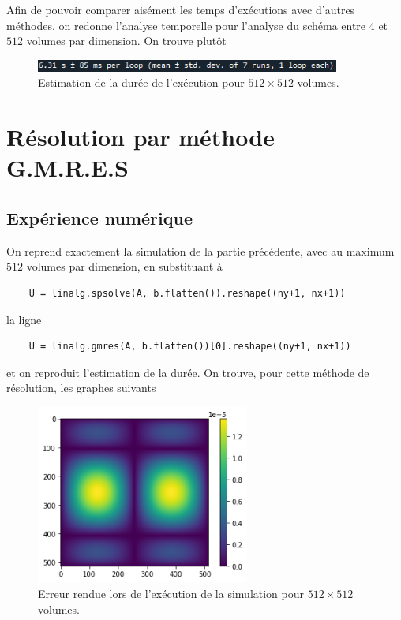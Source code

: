 Afin de pouvoir comparer aisément les temps d'exécutions avec d'autres méthodes, on redonne l'analyse temporelle pour l'analyse du schéma entre $4$ et $512$ volumes par dimension. On trouve plutôt

\begin{figure}[!htp]
\centering
    \includegraphics[width=10cm]{Images/preliminaires/Laplace Dirichlet 2D creux/temps2.png}
    \caption{Estimation de la durée de l'exécution pour $512 \times 512$ volumes.}
    \label{fig:creuxLaplacienDirichlet2DTemps2}
\end{figure}

\newpage

\section{Résolution par méthode G.M.R.E.S}

\subsection*{Expérience numérique} 

On reprend exactement la simulation de la partie précédente, avec au maximum $512$ volumes par dimension, en substituant à
\begin{verbatim}
    U = linalg.spsolve(A, b.flatten()).reshape((ny+1, nx+1))
\end{verbatim}
la ligne
\begin{verbatim}
    U = linalg.gmres(A, b.flatten())[0].reshape((ny+1, nx+1))
\end{verbatim}
et on reproduit l'estimation de la durée. On trouve, pour cette méthode de résolution, les graphes suivants
\begin{figure}[!htp]
    \centering
    \includegraphics[width=7cm]{Images/preliminaires/Laplace Dirichlet 2D creux GMRES/erreur.png}
    \caption{Erreur rendue lors de l'exécution de la simulation pour $512 \times 512$ volumes.}
    \label{fig:creuxLaplacien2DGMRESErreur}
\end{figure}

